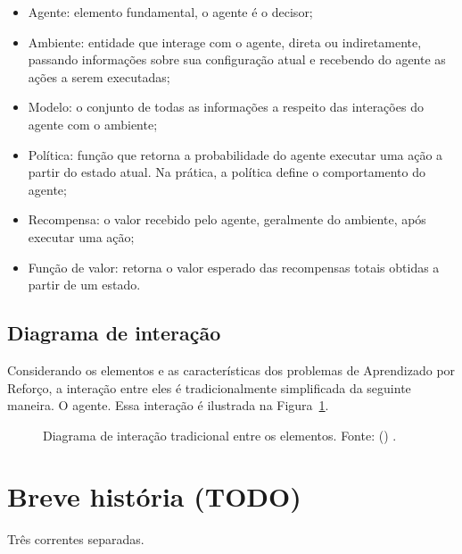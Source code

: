 \documentclass{article}
\begin{document}
        \begin{itemize}
            \item Agente: elemento fundamental, o agente é o decisor;
            \item Ambiente: entidade que interage com o agente, direta ou indiretamente, passando informações sobre sua configuração atual e recebendo do agente as ações a serem executadas;
            \item Modelo: o conjunto de todas as informações a respeito das interações do agente com o ambiente;
            \item Política: função que retorna a probabilidade do agente executar uma ação a partir do estado atual. Na prática, a política define o comportamento do agente;
            \item Recompensa: o valor recebido pelo agente, geralmente do ambiente, após executar uma ação;
            \item Função de valor: retorna o valor esperado das recompensas totais obtidas a partir de um estado.
        \end{itemize}
        
        \subsection{Diagrama de interação}
    
            Considerando os elementos e as características dos problemas de Aprendizado por Reforço, a interação entre eles é tradicionalmente simplificada da seguinte maneira. O agente. Essa interação é ilustrada na Figura~\ref{diag:classical-rl}.
        
            \begin{figure}[ht]
                \centering
                \vspace*{5mm}
                \rlinteraction
                \vspace*{-5mm}
                \caption{Diagrama de interação tradicional entre os elementos. Fonte: \citeauthor{Sutton2018} (\citeyear{Sutton2018}) \cite{Sutton2018}.}
                \label{diag:classical-rl}
            \end{figure}
    
    \section{Breve história (TODO)}
    
        Três correntes separadas.
        
\end{document}
